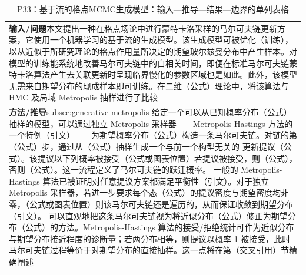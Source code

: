 \documentclass[UTF8,11pt,oneside]{ctexbook}
\begin{document}
\begin{table}[htbp]
  \centering
  \caption*{P33：基于流的格点MCMC生成模型：输入—推导—结果—边界的单列表格}
  \small
  \begin{tabular}{@{}p{}@{}}
    \toprule
    \textbf{输入/问题}\quad 本文提出一种在格点场论中进行蒙特卡洛采样的马尔可夫链更新方案，它使用一个机器学习的基于流的生成模型。该生成模型可被优化（训练），以从近似于所研究理论的格点作用量所决定的期望玻尔兹曼分布中产生样本。对模型的训练能系统地改善马尔可夫链中的自相关时间，即便在标准马尔可夫链蒙特卡洛算法产生去关联更新时呈现临界慢化的参数区域也是如此。此外，该模型无需来自期望分布的现成样本即可训练。在二维（公式）理论中，将该算法与 HMC 及局域 Metropolis 抽样进行了比较 \\
    \textbf{方法/推导}\quad subsec:generative-metropolis 给定一个可以从已知概率分布（公式）抽样的模型，可以通过独立 Metropolis 采样器——Metropolis-Hastings 方法的一个特例（引文）——为期望概率分布（公式）构造一条马尔可夫链。对链的第（公式）步，通过从（公式）抽样生成一个与前一个构型无关的 更新提议（公式）。该提议以下列概率被接受（公式或图表位置）若提议被接受，则（公式），否则（公式）。这一流程定义了马尔可夫链的跃迁概率。 一般的 Metropolis-Hastings 算法已被证明对任意提议方案都满足平衡性（引文）。对于独立 Metropolis 采样器，若进一步要求每个态（公式）的提议密度与期望密度均非零，（公式或图表位置）则该马尔可夫链还是遍历的，从而保证收敛到期望分布（引文）。 可以直观地把这条马尔可夫链视为将近似分布（公式）修正为期望分布（公式）的方法。Metropolis-Hastings 算法的接受/拒绝统计可作为近似分布与期望分布接近程度的诊断量；若两分布相等，则提议以概率 1 被接受，此时马尔可夫链过程等价于对期望分布的直接抽样。这一点将在第（交叉引用）节精确阐述 \\

\end{tabular}
\end{table}
\end{document}
